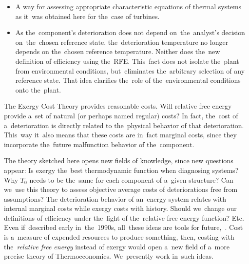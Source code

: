 \documentclass[energies,article,accept,moreauthors,pdftex]{Definitions/mdpi}
\begin{document}
\begin{itemize}[leftmargin=*,labelsep=5.5mm]
	\item A way for assessing appropriate characteristic equations of thermal systems as it~was obtained here for the~case of  turbines.
	\item As the~component's deterioration  does not depend on~the~analyst's decision on~the~chosen reference state, the~deterioration temperature no longer  depends on  the~chosen reference temperature.  Neither does the~new definition of efficiency using the~RFE. This~fact does not isolate the~plant from environmental conditions, but~eliminates the~arbitrary selection of any reference state. That idea clarifies the~role of the~environmental conditions onto the~plant.
\end{itemize}

The Exergy Cost Theory provides reasonable costs. Will relative free energy provide a~set of natural (or perhaps named regular) costs? In fact, the~cost of a~deterioration is directly related to the~physical behavior of that deterioration. This~way it~also means that these costs are in~fact marginal costs, since they incorporate the~future malfunction behavior of the~component.

The theory sketched here opens new fields of knowledge, since new questions appear:  Is exergy the~best thermodynamic function when diagnosing systems? Why $T_0$ needs to be the~same for each component of a~given structure? Can we~use this theory to assess objective average costs of deteriorations free from assumptions? The deterioration behavior of an~energy system relates with internal marginal costs while exergy costs with history. Should we~change our definitions of efficiency under the~light of the~relative free energy function? Etc. Even if~described early in~the~1990s, all~these ideas are tools for future,~\cite{Naredo2000}. Cost is a~measure of expended resources to produce something, then, costing with the~\emph{relative free energy} instead of exergy would open a~new field of a~more precise theory of Thermoeconomics. We~presently work in~such ideas.
\vspace{12pt}

\end{document}
